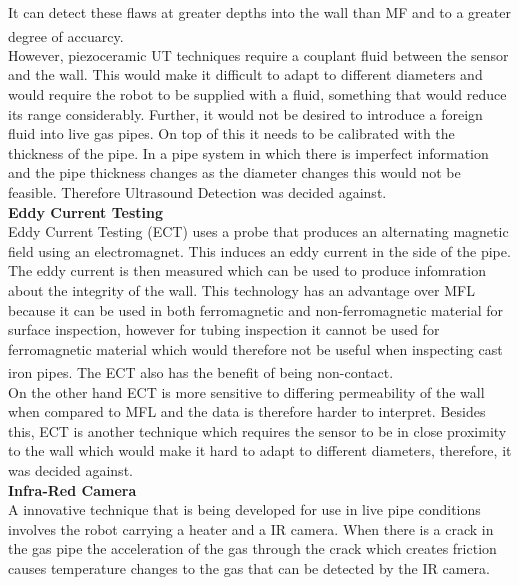 \documentclass[11pt]{article}		%
\newcommand{\supercite}[1]{\textsuperscript{\cite{#1}}}		%
\begin{document}
	        It can detect these flaws at greater depths into the wall than MF and to a greater degree of accuarcy.\supercite{MFL_Pig} 
	        \\
	        However, piezoceramic UT techniques require a couplant fluid between the sensor and the wall. 
	        This would make it difficult to adapt to different diameters and would require the robot to be supplied with a fluid, something that would reduce its range considerably.
	        Further, it would not be desired to introduce a foreign fluid into live gas pipes. 
	        On top of this it needs to be calibrated with the thickness of the pipe. 
	        In a pipe system in which there is imperfect information and the pipe thickness changes as the diameter changes this would not be feasible. 
	        Therefore Ultrasound Detection was decided against.
	        \\
	        \textbf{Eddy Current Testing}
	        \\
	        Eddy Current Testing (ECT) uses a probe that produces an alternating magnetic field using an electromagnet.
	        This induces an eddy current in the side of the pipe. 
	        The eddy current is then measured which can be used to produce infomration about the integrity of the wall.
	        This technology has an advantage over MFL because it can be used in both ferromagnetic and non-ferromagnetic material for surface inspection, however for tubing inspection it cannot be used for ferromagnetic material which would therefore not be useful when inspecting cast iron pipes.
	        The ECT  also has the benefit of being non-contact.\supercite{Corrosion}
	        \\
	        On the other hand ECT is more sensitive to differing permeability of the wall when compared to MFL and the data is therefore harder to interpret. %
	        Besides this, ECT is another technique which requires the sensor to be in close proximity to the wall which would make it hard to adapt to different diameters, therefore, it was decided against.
	        \\
	        \textbf{Infra-Red Camera}
	        \\
	        A innovative technique that is being developed for use in live pipe conditions involves the robot carrying a heater and a IR camera. 
	        When there is a crack in the gas pipe the acceleration of the gas through the crack which creates friction causes temperature changes to the gas that can be detected by the IR camera. 
\end{document}
